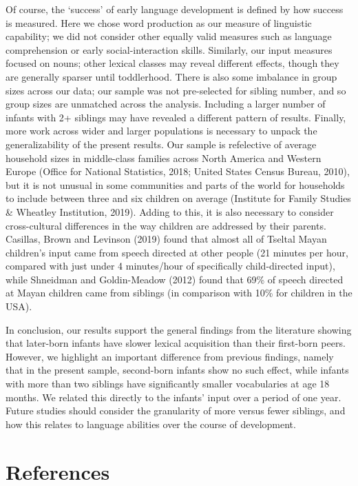 \documentclass[
  man,floatsintext]{apa6}
\begin{document}
Of course, the `success' of early language development is defined by how success is measured. Here we chose word production as our measure of linguistic capability; we did not consider other equally valid measures such as language comprehension or early social-interaction skills. Similarly, our input measures focused on nouns; other lexical classes may reveal different effects, though they are generally sparser until toddlerhood. There is also some imbalance in group sizes across our data; our sample was not pre-selected for sibling number, and so group sizes are unmatched across the analysis. Including a larger number of infants with 2+ siblings may have revealed a different pattern of results. Finally, more work across wider and larger populations is necessary to unpack the generalizability of the present results. Our sample is refelective of average household sizes in middle-class families across North America and Western Europe (Office for National Statistics, 2018; United States Census Bureau, 2010), but it is not unusual in some communities and parts of the world for households to include between three and six children on average (Institute for Family Studies \& Wheatley Institution, 2019). Adding to this, it is also necessary to consider cross-cultural differences in the way children are addressed by their parents. Casillas, Brown and Levinson (2019) found that almost all of Tseltal Mayan children's input came from speech directed at other people (21 minutes per hour, compared with just under 4 minutes/hour of specifically child-directed input), while Shneidman and Goldin-Meadow (2012) found that 69\% of speech directed at Mayan children came from siblings (in comparison with 10\% for children in the USA).

In conclusion, our results support the general findings from the literature showing that later-born infants have slower lexical acquisition than their first-born peers. However, we highlight an important difference from previous findings, namely that in the present sample, second-born infants show no such effect, while infants with more than two siblings have significantly smaller vocabularies at age 18 months. We related this directly to the infants' input over a period of one year. Future studies should consider the granularity of more versus fewer siblings, and how this relates to language abilities over the course of development.

\newpage

\hypertarget{references}{%
\section{References}\label{references}}
\end{document}
